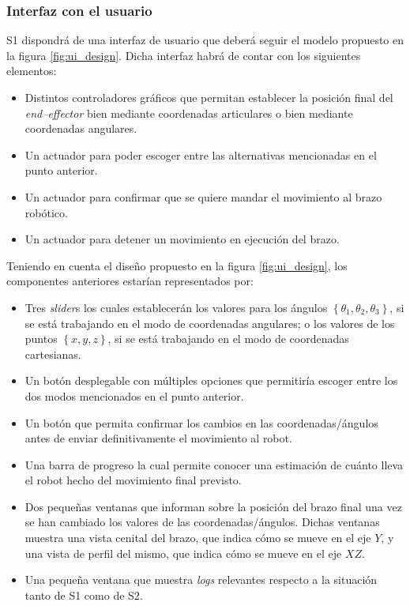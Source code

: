 \subsubsection{Interfaz con el usuario}
\label{sec:ui_reqs}
\ac{S1} dispondrá de una interfaz de usuario que deberá seguir el modelo propuesto en la figura \ref{fig:ui_design}. Dicha interfaz habrá de contar con los siguientes elementos:
\begin{itemize}
    \item Distintos controladores gráficos que permitan establecer la posición final del \textit{end--effector} bien mediante coordenadas articulares o bien mediante coordenadas angulares.
    \item Un actuador para poder escoger entre las alternativas mencionadas en el punto anterior.
    \item Un actuador para confirmar que se quiere mandar el movimiento al brazo robótico.
    \item Un actuador para detener un movimiento en ejecución del brazo.
\end{itemize}

Teniendo en cuenta el diseño propuesto en la figura \ref{fig:ui_design}, los componentes anteriores estarían
representados por:

\begin{itemize}
    \item Tres \textit{slider}s los cuales establecerán los valores para los ángulos 
    $\left\{\theta_1, \theta_2, \theta_3\right\}$, si se está trabajando en el modo de coordenadas
    angulares; o los valores de los puntos $\left\{x, y, z\right\}$, si se está trabajando en el modo
    de coordenadas cartesianas.
    \item Un botón desplegable con múltiples opciones que permitiría escoger entre los dos modos
    mencionados en el punto anterior.
    \item Un botón que permita confirmar los cambios en las coordenadas/ángulos antes de enviar
    definitivamente el movimiento al robot.
    \item Una barra de progreso la cual permite conocer una estimación de cuánto lleva el robot hecho
    del movimiento final previsto.
    \item Dos pequeñas ventanas que informan sobre la posición del brazo final una vez se han
    cambiado los valores de las coordenadas/ángulos. Dichas ventanas muestra una vista cenital del
    brazo, que indica cómo se mueve en el eje $Y$, y una vista de perfil del mismo, que indica cómo
    se mueve en el eje $XZ$.
    \item Una pequeña ventana que muestra \textit{logs} relevantes respecto a la situación tanto
    de \ac{S1} como de \ac{S2}.
\end{itemize}